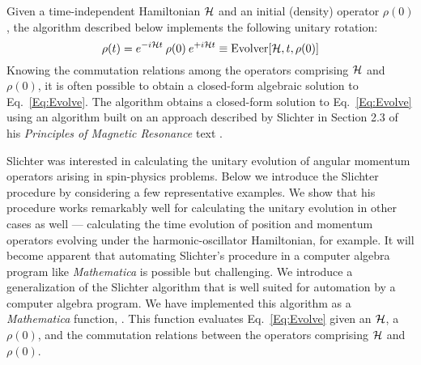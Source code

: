 %
%
%
%
%
%
%
%
%

Given a time-independent Hamiltonian ${\cal H}$ and an initial (density) operator $\rho(0)$, the  algorithm described below implements the following unitary rotation:
\begin{equation}
\rho(t) 
	= e^{-i {\cal H} t} \: \rho(0) \: e^{+i {\cal H} t}
	\equiv \text{{Evolver}}[{\cal H},t,\rho(0)]
	\label{Eq:Evolve}
\end{equation}
Knowing the commutation relations among the operators comprising ${\cal H}$ and $\rho(0)$, it is often possible to obtain a closed-form algebraic solution to Eq.~\ref{Eq:Evolve}.  The  algorithm obtains a closed-form solution to Eq.~\ref{Eq:Evolve} using an algorithm built on an approach described by Slichter in Section 2.3 of his \emph{Principles of Magnetic Resonance} text \cite{Slichter1990}.

Slichter was interested in calculating the unitary evolution of angular momentum operators arising in spin-physics problems.  Below we introduce the Slichter procedure by considering a few representative examples.  We show that his procedure works remarkably well for calculating the unitary evolution in other cases as well --- calculating the time evolution of position and momentum operators evolving under the harmonic-oscillator Hamiltonian, for example.  It will become apparent that automating Slichter's procedure in a computer algebra program like \emph{Mathematica} is possible but challenging.  We introduce a generalization of the Slichter algorithm that is well suited for automation by a computer algebra program.  We have implemented this algorithm as a \emph{Mathematica} function, .  This function evaluates Eq.~\ref{Eq:Evolve} given an ${\cal H}$, a $\rho(0)$, and the commutation relations between the operators comprising ${\cal H}$ and $\rho(0)$.

